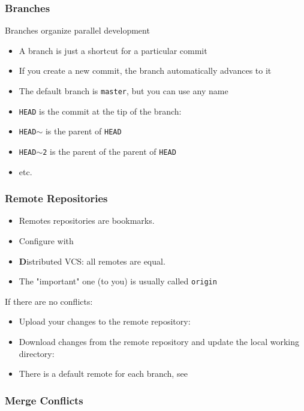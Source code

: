 \begin{frame}
  \frametitle{Branches}

  Branches organize parallel development
  \begin{itemize}
  \item A branch is just a shortcut for a particular commit
  \item If you create a new commit, the branch automatically advances
    to it
  \item The default branch is \texttt{master}, but you can use any name
  \item \texttt{HEAD} is the commit at the tip of the branch:\\
  \item \texttt{HEAD$\sim$} is the parent of \texttt{HEAD}
  \item \texttt{HEAD$\sim$2} is the parent of the parent of
    \texttt{HEAD}
  \item etc.
  \end{itemize}
\end{frame}


\begin{frame}
  \frametitle{Remote Repositories}
  
  \begin{itemize}
  \item Remotes repositories are bookmarks.
  \item Configure with 
  \item \textbf{D}istributed VCS: all remotes are equal.
  \item The "important" one (to you) is usually called \texttt{origin}
  \end{itemize}

  If there are no conflicts:
  \begin{itemize}
  \item Upload your changes to the remote repository:\\
  \item Download changes from the remote repository and update the
    local working directory:\\
  \item There is a default remote for each branch, see\\
  \end{itemize}

\end{frame}




\begin{frame}
  \frametitle{Merge Conflicts}
  
  
\end{frame}




